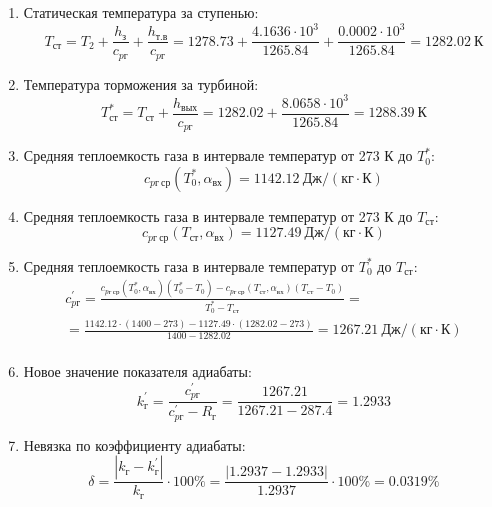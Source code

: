 \documentclass[a4paper,10pt]{article}
\begin{document}
\begin{enumerate}
        \item Статическая температура за ступенью:
        \[
            T_{ст} = T_2 + \frac{ h_з }{ c_{pг} } + \frac{ h_{т.в} }{ c_{pг} } =
                1278.73 +
                \frac{4.1636 \cdot 10^3 }{ 1265.84 } +
                \frac{ 0.0002 \cdot 10^3 }{ 1265.84 } =
            1282.02 \ К
        \]

        \item Температура торможения за турбиной:
        \[
            T_{ст}^* = T_{ст} + \frac{ h_{вых} }{ c_{pг} } =
                1282.02 +
                \frac{ 8.0658 \cdot 10^3 }{ 1265.84 } =
            1288.39 \ К
        \]

        \item Средняя теплоемкость газа в интервале температур от 273 К до $T_0^*$:
        \[
            c_{pг\ ср} (T_0^*, \alpha_{вх}) =
            1142.12 \ Дж/(кг \cdot К)
        \]

        \item Средняя теплоемкость газа в интервале температур от 273 К до $T_{ст}$:
        \[
            c_{pг\ ср} (T_{ст}, \alpha_{вх}) =
            1127.49 \ Дж/(кг \cdot К)
        \]

        \item Средняя теплоемкость газа в интервале температур от $T_0^*$ до $T_{ст}$:
        \begin{gather*}
            c_{pг}^\prime = \frac{
		        c_{pг\ ср} (T_0^*, \alpha_{вх}) (T_0^* - T_0) - c_{pг\ ср} (T_{ст}, \alpha_{вх})(T_{ст} - T_0)
		    }{
		        T_0^* - T_{ст}} =\\
            =\frac{
		        1142.12 \cdot
                (1400 - 273) -
		        1127.49 \cdot
                (1282.02 - 273)
		    }{
		        1400 - 1282.02} =
		    1267.21 \ Дж / (кг \cdot К)\\
        \end{gather*}

        \item Новое значение показателя адиабаты:
        \[
            k_г^\prime = \frac{c_{pг}^\prime}{c_{pг}^\prime - R_г} =
                \frac{
                    1267.21
                }{
                    1267.21 - 287.4
                }
            = 1.2933
        \]

        \item Невязка по коэффициенту адиабаты:
        \[
            \delta = \frac{ \left| k_г - k_г^\prime \right| }{ k_г } \cdot 100 \%=
                \frac{
                    \left| 1.2937 - 1.2933 \right|
                }{
                    1.2937
                } \cdot 100 \% =
            0.0319 \%
        \]


\end{enumerate}
\end{document}
